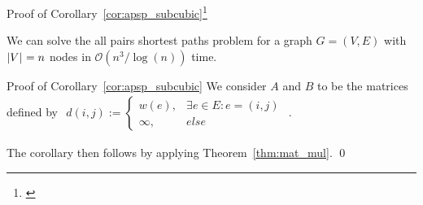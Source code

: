 \begin{frame}{Proof of Corollary~\ref{cor:apsp_subcubic}\footnote[1]{\cite[Corollary~3.3]{Chan2007}}}
    \setcounter{theorem}{3}
    \begin{corollary}
        We can solve the all pairs shortest paths problem for a graph $G = (V, E)$ with $\left\lvert V\right\rvert_{} = n$ nodes in $\mathcal{O}\left( n^3 / \log(n) \right)$ time.
    \end{corollary}
\end{frame}

\begin{frame}{Proof of Corollary~\ref{cor:apsp_subcubic}}
    We consider $A$ and $B$ to be the matrices defined by $\begin{aligned}d(i, j) := \begin{cases}
        w(e), &\exists e \in E: e = (i, j) \\
        \infty, &else
    \end{cases}\end{aligned}$.

    The corollary then follows by applying Theorem~\ref{thm:mat_mul}. \qed{}
\end{frame}
